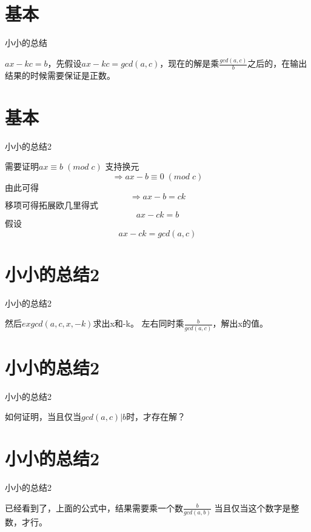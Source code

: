 \documentclass[aspectratio=43]{beamer}
\begin{document}
\section{基本}
\begin{frame}{小小的总结}
\begin{card}
$ax-kc=b$，先假设$ax-kc=gcd(a, c)$，现在的解是乘$\frac{gcd(a, c)}{b}$之后的，在输出结果的时候需要保证是正数。
\end{card}
\end{frame}

\section{基本}
\begin{frame}{小小的总结2}
\begin{card}
需要证明$ax \equiv b \; (mod \; c)$
支持换元
$$\Rightarrow ax - b \equiv 0 \; (mod \; c)$$
由此可得
$$\Rightarrow ax - b = ck$$
移项可得拓展欧几里得式
$$ ax-  ck = b$$
假设
$$ ax - ck = gcd(a, c)$$
\end{card}
\end{frame}

\section{小小的总结2}
\begin{frame}{小小的总结2}
\begin{card}
然后$exgcd(a, c, x, -k)$求出x和-k。
左右同时乘$\frac{b}{gcd(a, c)}$，解出x的值。
\end{card}
\end{frame}

\section{小小的总结2}
\begin{frame}{小小的总结2}
\begin{card}
如何证明，当且仅当$gcd(a, c) | b$时，才存在解？
\end{card}
\end{frame}

\section{小小的总结2}
\begin{frame}{小小的总结2}
\begin{card}
已经看到了，上面的公式中，结果需要乘一个数$\frac{b}{gcd(a, b)}$
当且仅当这个数字是整数，才行。
\end{card}
\end{frame}
\end{document}
